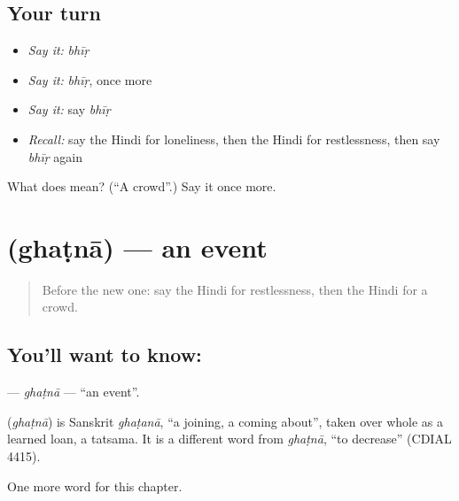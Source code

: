 \subsection*{Your turn}
\begin{itemize}
\raggedright
  \item \emph{Say it:} \emph{bhīṛ}
  \item \emph{Say it:} \emph{bhīṛ}, once more
  \item \emph{Say it:} say \emph{bhīṛ}
  \item \emph{Recall:} say the Hindi for loneliness, then the Hindi for restlessness, then say \emph{bhīṛ} again
\end{itemize}

\begin{tcolorbox}[breakable,colback=teal!4,colframe=teal!35!black,title={Before you move on}]
What does  mean? (\textquotedblleft{}A crowd\textquotedblright{}.) Say it once more.
\end{tcolorbox}
\section[\texorpdfstring{\hi{घटना} (ghaṭnā)}{घटना (ghaṭnā)}]{ (ghaṭnā) — an event}

\label{lesson:HI-C259-ghatna}



\begin{quote}
Before the new one: say the Hindi for restlessness, then the Hindi for a crowd.
\end{quote}

\subsection*{You'll want to know: }
\textbf{} — \emph{ghaṭnā} — \textquotedblleft{}an event\textquotedblright{}.

\begin{cousinweb}
\textbf{} (\emph{ghaṭnā}) is Sanskrit \emph{ghaṭanā}, \textquotedblleft{}a joining, a coming about\textquotedblright{}, taken over whole as a learned loan, a tatsama. It is a different word from \emph{ghaṭnā}, \textquotedblleft{}to decrease\textquotedblright{} (CDIAL 4415).
\end{cousinweb}

\begin{grammarlens}[title={What you've built}]
One more word for this chapter.
\end{grammarlens}

